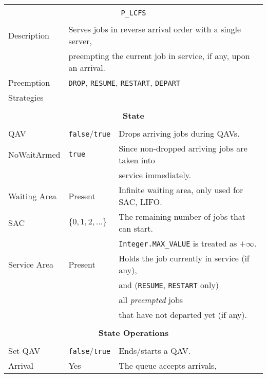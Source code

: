 \documentclass[12pt]{book}
\begin{document}
\begin{tabular}{|l|l|l|}
\hline
\multicolumn{3}{|c|}{} \\
\multicolumn{3}{|c|}{\lstinline[basicstyle=\large]{P_LCFS}} \\
\multicolumn{3}{|c|}{} \\
\hline
Description & \multicolumn{2}{l|}{Serves jobs in reverse arrival order with a single server,} \\
            & \multicolumn{2}{l|}{preempting the current job in service, if any, upon an arrival.} \\
\hline
Preemption  & \multicolumn{2}{l|}{\lstinline|DROP|, \lstinline|RESUME|, \lstinline|RESTART|, \lstinline|DEPART|} \\
Strategies  & \multicolumn{2}{l|}{ } \\
\hline
\multicolumn{3}{|c|}{} \\
\multicolumn{3}{|c|}{\bf State} \\
\multicolumn{3}{|c|}{} \\
\hline
QAV & \lstinline|false|/\lstinline|true| & Drops arriving jobs during QAVs. \\
\hline
NoWaitArmed & \lstinline|true| & Since non-dropped arriving jobs are taken into \\
            &                  & service immediately. \\
\hline
Waiting Area & Present & Infinite waiting area, only used for SAC, LIFO. \\
\hline
SAC & $\{0, 1, 2, \ldots\}$ & The remaining number of jobs that can start. \\
    &                       & \lstinline|Integer.MAX_VALUE| is treated as $+\infty$. \\
\hline
Service Area & Present & Holds the job currently in service (if any), \\
             &         & and (\lstinline|RESUME|, \lstinline|RESTART| only) \\
             &         & all {\em preempted\/} jobs \\
             &         & that have not departed yet (if any). \\
\hline
\multicolumn{3}{|c|}{} \\
\multicolumn{3}{|c|}{\bf State Operations} \\
\multicolumn{3}{|c|}{} \\
\hline
Set QAV & \lstinline|false|/\lstinline|true| & Ends/starts a QAV. \\
\hline
Arrival & Yes & The queue accepts arrivals, \\

\end{tabular}
\end{document}
